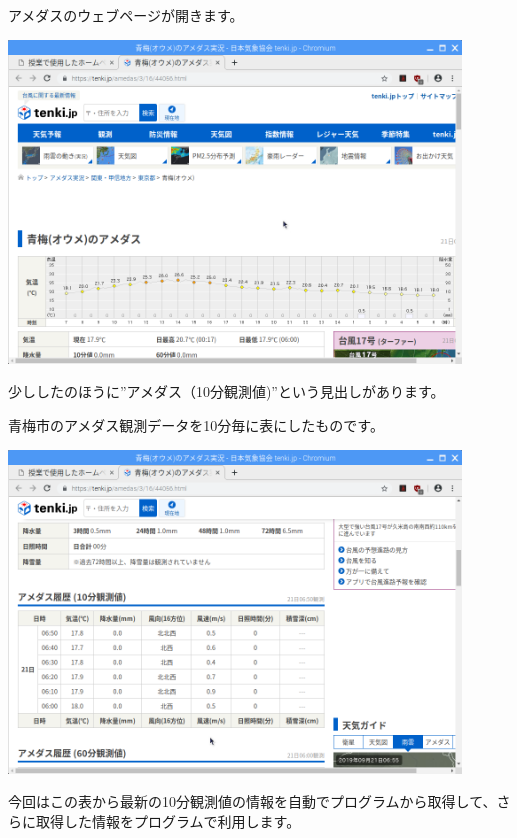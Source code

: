 アメダスのウェブページが開きます。

\begin{center}
\includegraphics[width=0.9\textwidth]{./text08-img/textbook-img028.png}

\end{center}
\clearpage
少ししたのほうに”アメダス（10分観測値)”という見出しがあります。

青梅市のアメダス観測データを10分毎に表にしたものです。



\begin{center}
\includegraphics[width=0.9\textwidth]{./text08-img/textbook-img029.png}

\end{center}
今回はこの表から最新の10分観測値の情報を自動でプログラムから取得して、さらに取得した情報をプログラムで利用します。



